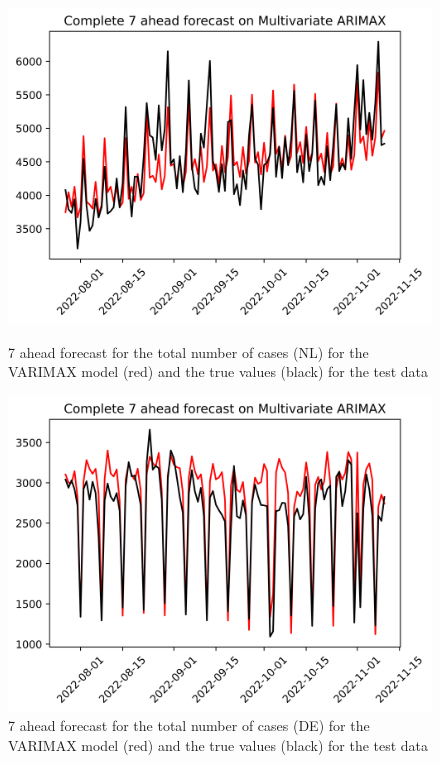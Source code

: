 \begin{figure}

\begin{minipage}{.45\textwidth}
  \centering
  \includegraphics[width=\linewidth]{pics/7_ah/Complete_7_ahead_Multivariate ARIMAX.png}
  \caption{7 ahead forecast for the total number of cases (NL) for the VARIMAX model (red) and the true values (black) for the test data}
  \label{fig:tot_cases_fc_7_VARIMAX}
\end{minipage}
\begin{minipage}{.45\textwidth}
  \centering
  \includegraphics[width=\linewidth]{pics/7_ah/DE_Complete_7_ahead_Multivariate ARIMAX.png}
  \caption{7 ahead forecast for the total number of cases (DE) for the VARIMAX model (red) and the true values (black) for the test data}
  \label{fig:tot_cases_fc_7_VARIMAX_DE}
\end{minipage}

\end{figure}
